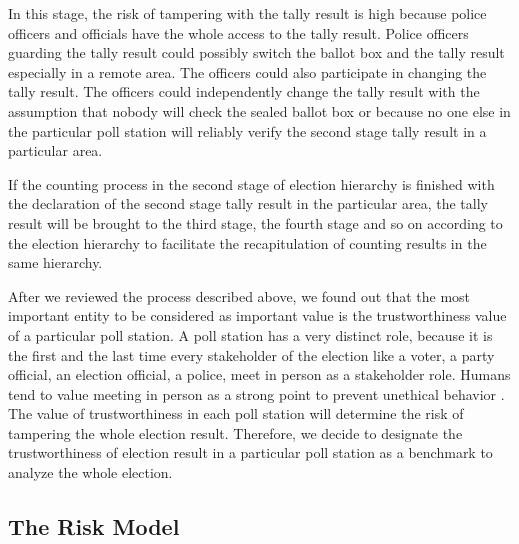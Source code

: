 \documentclass[JIP]{ipsj}
\begin{document}
In this stage, the risk of tampering with the tally result is high because police officers and officials have the whole access to the tally result. Police officers guarding the tally result could possibly switch the ballot box and the tally result especially in a remote area. The officers could also participate in changing the tally result. The officers could independently change the tally result with the assumption that nobody will check the sealed ballot box or because no one else in the particular poll station will reliably verify the second stage tally result in a particular area.

If the counting process in the second stage of election hierarchy is finished with the declaration of the second stage tally result in the particular area, the tally result will be brought to the third stage, the fourth stage and so on according to the election hierarchy to facilitate the recapitulation of counting results in the same hierarchy.

After we reviewed the process described above, we found out that the most important entity to be considered as important value is the trustworthiness value of a particular poll station. A poll station has a very distinct role, because it is the first and the last time every stakeholder of the election like a voter, a party official, an election official, a police, meet in person as a stakeholder role. Humans tend to value meeting in person as a strong point to prevent unethical behavior \cite{Nogami2009}. The value of trustworthiness in each poll station will determine the risk of tampering the whole election result. Therefore, we decide to designate the trustworthiness of election result in a particular poll station as a benchmark to analyze the whole election.


\subsection{The Risk Model}%
\end{document}

